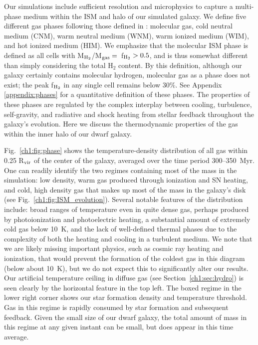 Our simulations include sufficient resolution and microphysics to capture a multi-phase medium within the ISM and halo of our simulated galaxy. We define five different gas phases following those defined in \citep{Draine2011}: molecular gas, cold neutral medium (CNM), warm neutral medium (WNM), warm ionized medium (WIM), and hot ionized medium (HIM). We emphasize that the molecular ISM phase is defined as all cells with M$_{\rm H_2}$/M$_{\rm gas} = $~f$_{\rm H_2} > 0.5$, and is thus somewhat different than simply considering the total H$_2$ content. By this definition, although our galaxy certainly contains molecular hydrogen, molecular gas as a phase does not exist; the peak f$_{\rm H_2}$ in any single cell remains below 30\%. See Appendix \ref{appendix:phases} for a quantitative definition of these phases. The properties of these phases are regulated by the complex interplay between cooling, turbulence, self-gravity, and radiative and shock heating from stellar feedback throughout the galaxy's evolution. Here we discuss the thermodynamic properties of the gas within the inner halo of our dwarf galaxy.

Fig.~\ref{ch1:fig:phase} shows the temperature-density distribution of all gas within 0.25 R$_{\rm vir}$ of the center of the galaxy, averaged over the time period 300--350~Myr. One can readily identify the two regimes containing most of the mass in the simulation: low density, warm gas produced through ionization and SN heating, and cold, high density gas that makes up most of the mass in the galaxy's disk (see Fig.~\ref{ch1:fig:ISM_evolution}). Several notable features of the distribution include: broad ranges of temperature even in quite dense gas, perhaps produced by photoionization and photoelectric heating, a substantial amount of extremely cold gas below 10~K, and the lack of well-defined thermal phases due to the complexity of both the heating and cooling in a turbulent medium. We note that we are likely missing important physics, such as cosmic ray heating and ionization, that would prevent the formation of the coldest gas in this diagram (below about 10~K), but we do not expect this to significantly alter our results. Our artificial temperature ceiling in diffuse gas (see Section~\ref{ch1:sec:hydro}) is seen clearly by the horizontal feature in the top left. The boxed regime in the lower right corner shows our star formation density and temperature threshold. Gas in this regime is rapidly consumed by star formation and subsequent feedback. Given the small size of our dwarf galaxy, the total amount of mass in this regime at any given instant can be small, but does appear in this time average.

